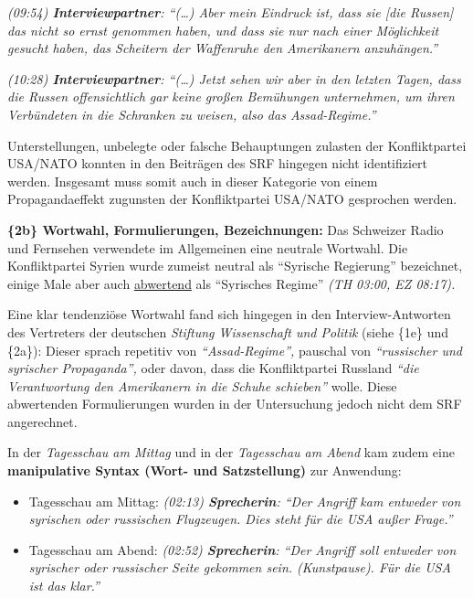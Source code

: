 \emph{(09:54) \textbf{Interviewpartner}: ``(\ldots{}) Aber mein Eindruck
ist, dass sie {[}die Russen{]} das nicht so ernst genommen haben, und
dass sie nur nach einer Möglichkeit gesucht haben, das Scheitern der
Waffenruhe den Amerikanern anzuhängen.''}

\emph{(10:28) \textbf{Interviewpartner}: ``(\ldots{}) Jetzt sehen wir
aber in den letzten Tagen, dass die Russen offensichtlich gar keine
großen Bemühungen unternehmen, um ihren Verbündeten in die Schranken zu
weisen, also das Assad-Regime.''}

Unterstellungen, unbelegte oder falsche Behauptungen zulasten der
Konfliktpartei USA/NATO konnten in den Beiträgen des SRF hingegen nicht
identifiziert werden. Insgesamt muss somit auch in dieser Kategorie von
einem Propagandaeffekt zugunsten der Konfliktpartei USA/NATO gesprochen
werden.

\textbf{\{2b\} Wortwahl, Formulierungen, Bezeichnungen:} Das Schweizer
Radio und Fernsehen verwendete im Allgemeinen eine neutrale Wortwahl.
Die Konfliktpartei Syrien wurde zumeist neutral als ``Syrische
Regierung'' bezeichnet, einige Male aber auch
\href{http://www.duden.de/rechtschreibung/Regime}{abwertend} als
``Syrisches Regime'' \emph{(TH 03:00, EZ 08:17).}

Eine klar tendenziöse Wortwahl fand sich hingegen in den
Interview-Antworten des Vertreters der deutschen \emph{Stiftung
Wissenschaft und Politik} (siehe \{1e\} und \{2a\}): Dieser sprach
repetitiv von \emph{``Assad-Regime'',} pauschal von \emph{``russischer
und syrischer Propaganda'',} oder davon, dass die Konfliktpartei
Russland \emph{``die Verantwortung den Amerikanern in die Schuhe
schieben''} wolle. Diese abwertenden Formulierungen wurden in der
Untersuchung jedoch nicht dem SRF angerechnet.

In der \emph{Tagesschau am Mittag} und in der \emph{Tagesschau am Abend}
kam zudem eine \textbf{manipulative Syntax (Wort- und Satzstellung)} zur
Anwendung:

\begin{itemize}
\tightlist
\item
  Tagesschau am Mittag: \emph{(02:13) \textbf{Sprecherin}: ``Der Angriff
  kam entweder von syrischen oder russischen Flugzeugen. Dies steht für
  die USA außer Frage.''}
\item
  Tagesschau am Abend: \emph{(02:52) \textbf{Sprecherin}: ``Der Angriff
  soll entweder von syrischer oder russischer Seite gekommen sein.
  (Kunstpause). Für die USA ist das klar.''}
\end{itemize}

